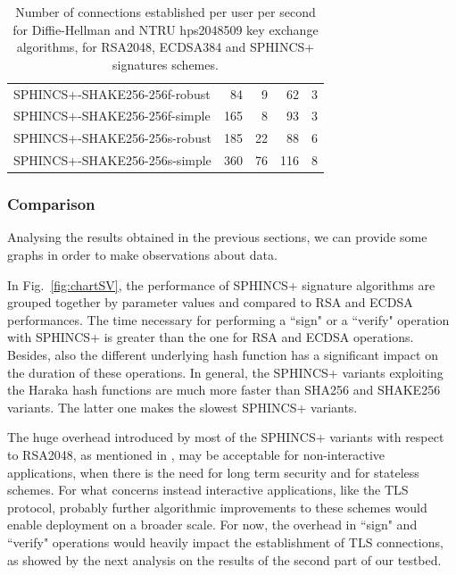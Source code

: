 \documentclass[a4paper,12pt]{article}
\def\myfig#1{Fig.~#1\xspace}
\begin{document}
\begin{table}[]
\begin{tabular}{@{}lrrrr@{}}
SPHINCS+-SHAKE256-256f-robust & 84                                      & 9                          & 62                                        & 3                          \\
SPHINCS+-SHAKE256-256f-simple & 165                                     & 8                         & 93                                        & 3                          \\
SPHINCS+-SHAKE256-256s-robust & 185                                     & 22                        & 88                                        & 6                          \\
SPHINCS+-SHAKE256-256s-simple & 360                                     & 76                         & 116                                       & 8                          \\ \bottomrule
\end{tabular}
\caption{Number of connections established per user per second for Diffie-Hellman and NTRU hps2048509 key exchange algorithms, for RSA2048, ECDSA384 and SPHINCS+ signatures schemes.}
\label{tab:results_s_time}
\end{table}

\subsubsection{Comparison}
\label{subsub:comparison}

Analysing the results obtained in the previous sections, we can provide some graphs in order to make observations about data.

In \myfig{\ref{fig:chartSV}}, the performance of SPHINCS+ signature algorithms are grouped together by parameter values and compared to RSA and ECDSA performances. The time necessary for performing a ``sign" or a ``verify" operation with SPHINCS+ is greater than the one for RSA and ECDSA operations.
Besides, also the different underlying hash function has a significant impact on the duration of these operations. In general, the SPHINCS+ variants exploiting the Haraka hash functions are much more faster than SHA256 and SHAKE256 variants. The latter one makes the slowest SPHINCS+ variants.

The huge overhead introduced by most of the SPHINCS+ variants with respect to RSA2048, as mentioned in \cite{8_ARM}, may be acceptable for non-interactive applications, when there is the need for long term security and for stateless schemes. For what concerns instead interactive applications, like the TLS protocol, probably further algorithmic improvements to these schemes would enable deployment on a broader scale. For now, the overhead in 
``sign" and ``verify" operations would heavily impact the establishment of TLS connections, as showed by the next analysis on the results of the second part of our testbed.
\end{document}
